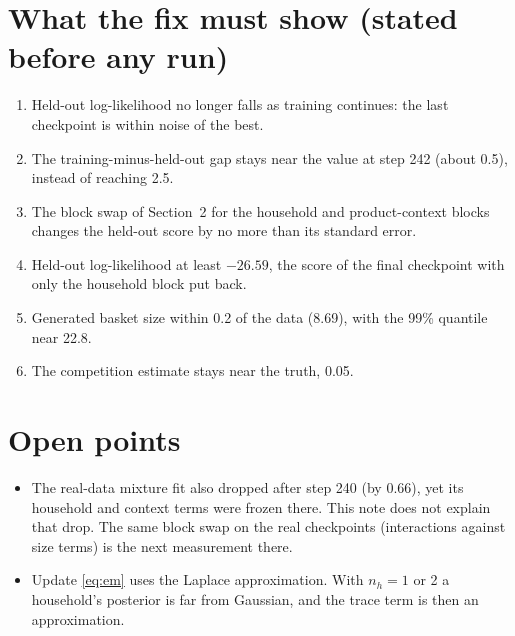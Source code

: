 \documentclass[11pt]{article}
\theoremstyle{remark}\newtheorem{remark}{Remark}
\begin{document}
\section{What the fix must show (stated before any run)}
\begin{enumerate}
\item Held-out log-likelihood no longer falls as training continues: the last checkpoint is within
  noise of the best.
\item The training-minus-held-out gap stays near the value at step 242 (about 0.5), instead of reaching 2.5.
\item The block swap of Section~2 for the household and product-context blocks changes the held-out
  score by no more than its standard error.
\item Held-out log-likelihood at least $-26.59$, the score of the final checkpoint with only the
  household block put back.
\item Generated basket size within 0.2 of the data (8.69), with the 99\% quantile near 22.8.
\item The competition estimate stays near the truth, 0.05.
\end{enumerate}

\section{Open points}
\begin{itemize}
\item The real-data mixture fit also dropped after step 240 (by 0.66), yet its household and context
  terms were frozen there. This note does not explain that drop. The same block swap on the real
  checkpoints (interactions against size terms) is the next measurement there.
\item Update \eqref{eq:em} uses the Laplace approximation. With $n_h=1$ or 2 a household's posterior
  is far from Gaussian, and the trace term is then an approximation.
\end{itemize}
\end{document}
